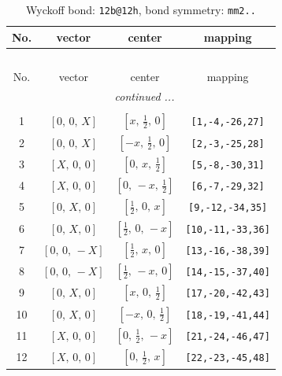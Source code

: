 \documentclass[fleqn,8pt]{jsarticle}
\begin{document}
\renewcommand{\arraystretch}{1.2}
\begin{longtable}{cccc}
\caption{Wyckoff bond: {\tt 12b@12h}, bond symmetry: {\tt mm2..}}
 \\
 \hline \hline
No. & vector & center & mapping \\ \hline \endfirsthead

\multicolumn{3}{l}{\tablename\ \thetable{}} \\
 \hline \hline
No. & vector & center & mapping \\ \hline \endhead

 \hline \hline
\multicolumn{3}{r}{\footnotesize\it continued ...} \\ \endfoot

 \hline \hline
\multicolumn{3}{r}{} \\ \endlastfoot

1 & $\left[ 0,\, 0,\, X \right]$ & $\left[ x,\, \frac{1}{2},\, 0 \right]$ & {\tt [1,-4,-26,27]} \\ \hline
2 & $\left[ 0,\, 0,\, X \right]$ & $\left[ - x,\, \frac{1}{2},\, 0 \right]$ & {\tt [2,-3,-25,28]} \\ \hline
3 & $\left[ X,\, 0,\, 0 \right]$ & $\left[ 0,\, x,\, \frac{1}{2} \right]$ & {\tt [5,-8,-30,31]} \\ \hline
4 & $\left[ X,\, 0,\, 0 \right]$ & $\left[ 0,\, - x,\, \frac{1}{2} \right]$ & {\tt [6,-7,-29,32]} \\ \hline
5 & $\left[ 0,\, X,\, 0 \right]$ & $\left[ \frac{1}{2},\, 0,\, x \right]$ & {\tt [9,-12,-34,35]} \\ \hline
6 & $\left[ 0,\, X,\, 0 \right]$ & $\left[ \frac{1}{2},\, 0,\, - x \right]$ & {\tt [10,-11,-33,36]} \\ \hline
7 & $\left[ 0,\, 0,\, - X \right]$ & $\left[ \frac{1}{2},\, x,\, 0 \right]$ & {\tt [13,-16,-38,39]} \\ \hline
8 & $\left[ 0,\, 0,\, - X \right]$ & $\left[ \frac{1}{2},\, - x,\, 0 \right]$ & {\tt [14,-15,-37,40]} \\ \hline
9 & $\left[ 0,\, X,\, 0 \right]$ & $\left[ x,\, 0,\, \frac{1}{2} \right]$ & {\tt [17,-20,-42,43]} \\ \hline
10 & $\left[ 0,\, X,\, 0 \right]$ & $\left[ - x,\, 0,\, \frac{1}{2} \right]$ & {\tt [18,-19,-41,44]} \\ \hline
11 & $\left[ X,\, 0,\, 0 \right]$ & $\left[ 0,\, \frac{1}{2},\, - x \right]$ & {\tt [21,-24,-46,47]} \\ \hline
12 & $\left[ X,\, 0,\, 0 \right]$ & $\left[ 0,\, \frac{1}{2},\, x \right]$ & {\tt [22,-23,-45,48]} \\
\end{longtable}
\end{document}
